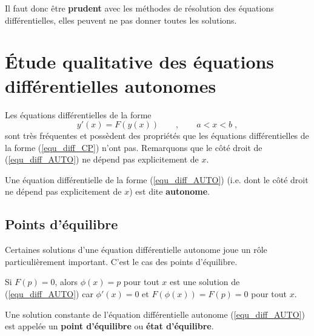 {\begin{egg}
Il faut donc être {\bfseries prudent} avec les méthodes de résolution des
équations différentielles, elles peuvent ne pas donner toutes les
solutions.
\end{egg}


\section[Équations autonomes \life]{Étude qualitative des équations
différentielles autonomes \life}

Les équations différentielles de la forme
\begin{equation}\label{equ_diff_AUTO}
y'(x) = F(y(x)) \qquad , \qquad a<x<b \; ,
\end{equation}
sont très fréquentes et possèdent des propriétés que les équations
différentielles de la forme (\ref{equ_diff_CP}) n'ont pas.
Remarquons que le côté droit de (\ref{equ_diff_AUTO}) ne dépend pas
explicitement de $x$.

\begin{defn} 
Une équation différentielle de la forme (\ref{equ_diff_AUTO})
(i.e. dont le côté droit ne dépend pas explicitement de $x$) est dite
{\bfseries autonome}.
\end{defn}

\subsection{Points d'équilibre}

Certaines solutions d'une équation différentielle autonome joue un
rôle particulièrement important.  C'est le cas des points d'équilibre.

Si $F(p)=0$, alors $\phi(x) = p$ pour tout $x$ est une solution de
(\ref{equ_diff_AUTO}) car $\phi'(x) = 0$ et
$F(\phi(x)) = F(p) = 0$ pour tout $x$.

\begin{defn} 
Une solution constante de l'équation différentielle autonome
(\ref{equ_diff_AUTO}) est appelée un
{\bfseries point d'équilibre} ou
{\bfseries état d'équilibre}. 
\end{defn}

}

